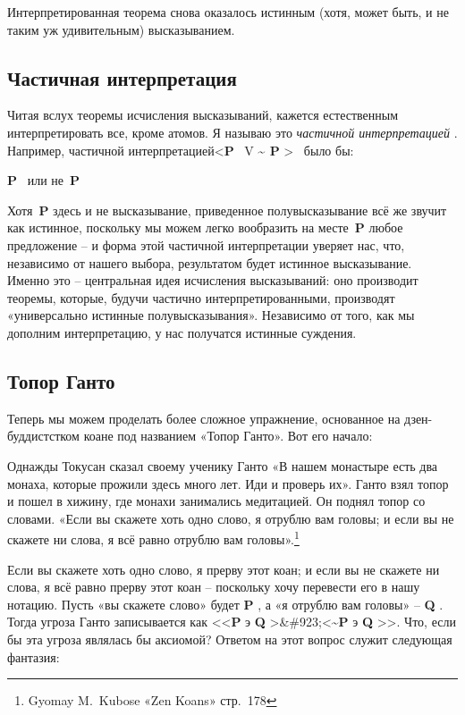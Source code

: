 \documentclass[../main.tex]{subfiles}
\begin{document}
Интерпретированная теорема снова оказалось истинным (хотя, может быть, и не таким уж удивительным) высказыванием.


\subsection{Частичная интерпретация}

Читая вслух теоремы исчисления высказываний, кажется естественным интерпретировать все, кроме атомов. Я называю это \emph{частичной интерпретацией} . Например, частичной интерпретацией\textless{}\textbf{P} ~V \textbf{\textasciitilde{} P} \textgreater~ было бы:

\textbf{P} ~или не~\textbf{P}

Хотя~\textbf{P} здесь и не высказывание, приведенное полувысказывание всё же звучит как истинное, поскольку мы можем легко вообразить на месте~\textbf{P} любое предложение \--- и форма этой частичной интерпретации уверяет нас, что, независимо от нашего выбора, результатом будет истинное высказывание. Именно это \--- центральная идея исчисления высказываний: оно производит теоремы, которые, будучи частично интерпретированными, производят «универсально истинные полувысказывания». Независимо от того, как мы дополним интерпретацию, у нас получатся истинные суждения.


\subsection{Топор Ганто}

Теперь мы можем проделать более сложное упражнение, основанное на дзен-буддистстком коане под названием «Топор Ганто». Вот его начало:

Однажды Токусан сказал своему ученику Ганто «В нашем монастыре есть два монаха, которые прожили здесь много лет. Иди и проверь их». Ганто взял топор и пошел в хижину, где монахи занимались медитацией. Он поднял топор со словами. «Если вы скажете хоть одно слово, я отрублю вам головы; и если вы не скажете ни слова, я всё равно отрублю вам головы».\footnote{Gyomay M.~Kubose «Zen Koans» стр.~178}

Если вы скажете хоть одно слово, я прерву этот коан; и если вы не скажете ни слова, я всё равно прерву этот коан \--- поскольку хочу перевести его в нашу нотацию. Пусть «вы скажете слово» будет \textbf{P} , а «я отрублю вам головы» \--- \textbf{Q} . Тогда угроза Ганто записывается как \textless\textless{}\textbf{P} э \textbf{Q} \textgreater\&\#923;\textless{}\textbf{\textasciitilde P} э \textbf{Q} \textgreater\textgreater. Что, если бы эта угроза являлась бы аксиомой? Ответом на этот вопрос служит следующая фантазия:
\end{document}
